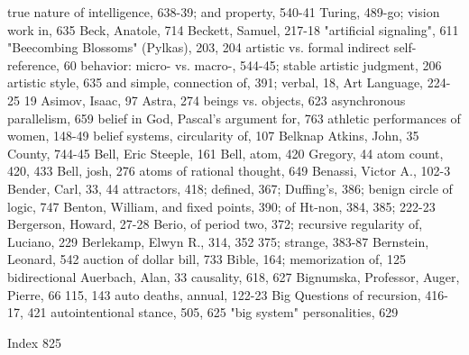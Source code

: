  true nature of intelligence, 638-39; and           property, 540-41
 Turing, 489-go; vision work in, 635               Beck, Anatole, 714 Beckett, Samuel, 217-18
"artificial signaling", 611                        "Beecombing Blossoms" (Pylkas), 203, 204
artistic vs. formal indirect self-reference, 60    behavior: micro- vs. macro-, 544-45; stable
 artistic judgment, 206 artistic style, 635         and simple, connection of, 391; verbal, 18,
Art Language, 224-25                                19
Asimov, Isaac, 97 Astra, 274                       beings vs. objects, 623
asynchronous parallelism, 659                      belief in God, Pascal's argument for, 763
athletic performances of women, 148-49              belief systems, circularity of, 107 Belknap
 Atkins, John, 35                                   County, 744-45 Bell, Eric Steeple, 161 Bell,
atom, 420                                           Gregory, 44
atom count, 420, 433                               Bell, josh, 276
atoms of rational thought, 649                     Benassi, Victor A., 102-3 Bender, Carl, 33, 44
attractors, 418; defined, 367; Duffing's, 386;      benign circle of logic, 747 Benton, William,
 and fixed points, 390; of Ht-non, 384, 385;        222-23 Bergerson, Howard, 27-28 Berio,
 of period two, 372; recursive regularity of,       Luciano, 229 Berlekamp, Elwyn R., 314, 352
 375; strange, 383-87                               Bernstein, Leonard, 542
auction of dollar bill, 733                        Bible, 164; memorization of, 125 bidirectional
Auerbach, Alan, 33                                  causality, 618, 627 Bignumska, Professor,
Auger, Pierre, 66                                   115, 143
auto deaths, annual, 122-23                        Big Questions of recursion, 416-17, 421
autointentional stance, 505, 625                   "big system" personalities, 629



 Index                                                                                       825

